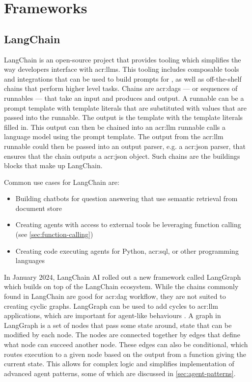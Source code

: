 \section{Frameworks}

\subsection{LangChain}

LangChain \citep{langchainaiLangchainaiLangchain2022} is an open-source project that provides tooling which simplifies the way developers interface with \glspl{acr:llm}. This tooling includes composable tools and integrations that can be used to build prompts for , as well as off-the-shelf chains that perform higher level tasks. Chains are \glspl{acr:dag} --- or sequences of runnables --- that take an input and produces and output. A runnable can be a prompt template with template literals that are substituted with values that are passed into the runnable. The output is the template with the template literals filled in. This output can then be chained into an \acrshort{acr:llm} runnable calls a language model using the prompt template. The output from the \acrshort{acr:llm} runnable could then be passed into an output parser, e.g. a \acrshort{acr:json} parser, that ensures that the chain outputs a \acrshort{acr:json} object. Such chains are the buildings blocks that make up LangChain.

Common use cases for LangChain are:

\begin{itemize}
    \item Building chatbots for question answering that use semantic retrieval from document store
    \item Creating agents with access to external tools be leveraging function calling (see \autoref{sec:function-calling})
    \item Creating code executing agents for Python, \acrshort{acr:sql}, or other programming languages
\end{itemize}

In January 2024, LangChain AI rolled out a new framework called LangGraph which builds on top of the LangChain ecosystem. While the chains commonly found in LangChain are good for \gls{acr:dag} workflow, they are not suited to creating cyclic graphs. LangGraph can be used to add cycles to \acrshort{acr:llm} applications, which are important for agent-like behaviours \citep{langchainaiLangchainaiLanggraph2024}. A graph in LangGraph is a set of nodes that pass some state around, state that can be modified by each node. The nodes are connected together by edges that define what node can succeed another node. These edges can also be conditional, which routes execution to a given node based on the output from a function giving the current state. This allows for complex logic and simplifies implementation of advanced agent patterns, some of which are discussed in \autoref{sec:agent-patterns}.





\glsresetall